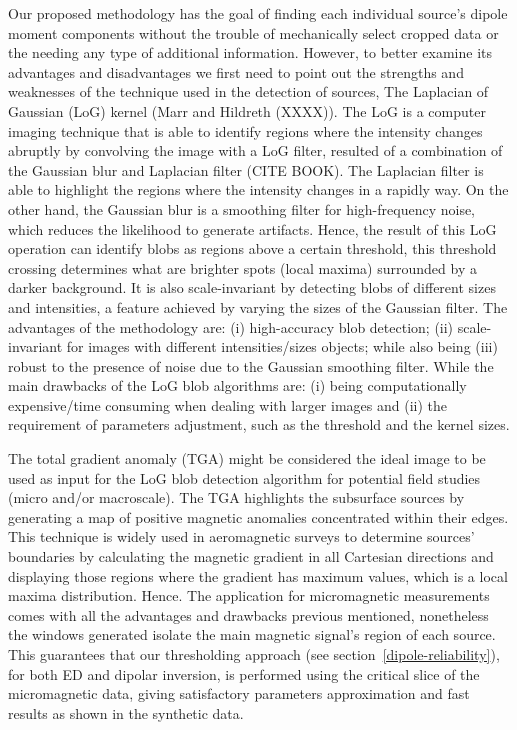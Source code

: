 Our proposed methodology has the goal of finding each individual source’s dipole moment components without the trouble of mechanically select cropped data or the needing any type of additional information. However, to better examine its advantages and disadvantages we first need to point out the strengths and weaknesses of the technique used in the detection of sources,  The Laplacian of Gaussian (LoG) kernel (Marr and Hildreth (XXXX)). The LoG is a computer imaging technique that is able to identify regions where the intensity changes abruptly by convolving the image with a LoG filter, resulted of a combination of the Gaussian blur and Laplacian filter (CITE BOOK). The Laplacian filter is able to highlight the regions where the intensity changes in a rapidly way. On the other hand, the Gaussian blur is a smoothing filter for high-frequency noise, which reduces the likelihood to generate artifacts. Hence, the result of this LoG operation can identify blobs as regions above a certain threshold, this threshold crossing determines what are brighter spots (local maxima) surrounded by a darker background. It is also scale-invariant by detecting blobs of different sizes and intensities, a feature achieved by varying the sizes of the Gaussian filter. The advantages of the methodology are: (i) high-accuracy blob detection; (ii) scale-invariant for images with different intensities/sizes objects; while also being (iii) robust to the presence of noise due to the Gaussian smoothing filter. While the main drawbacks of the LoG blob algorithms are: (i) being computationally expensive/time consuming when dealing with larger images and (ii) the requirement of parameters adjustment, such as the threshold and the kernel sizes. 

The total gradient anomaly (TGA) might be considered the ideal image to be used as input for the LoG blob detection algorithm for potential field studies (micro and/or macroscale). The TGA highlights the subsurface sources by generating a map of positive magnetic anomalies concentrated within their edges. This technique is widely used in aeromagnetic surveys to determine sources’ boundaries by calculating the magnetic gradient in all Cartesian directions and displaying those regions where the gradient has maximum values, which is a local maxima distribution. Hence. The application for micromagnetic measurements comes with all the advantages and drawbacks previous mentioned, nonetheless the windows generated isolate the main magnetic signal’s region of each source. This guarantees that our thresholding approach (see section~\ref{dipole-reliability}), for both ED and dipolar inversion, is performed using the critical slice of the micromagnetic data, giving satisfactory parameters approximation and fast results as shown in the synthetic data.

